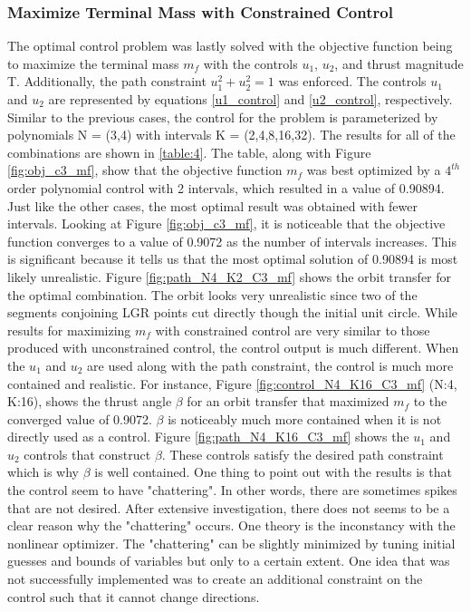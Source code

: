 \documentclass[]{article}
\begin{document}
	\subsubsection{Maximize Terminal Mass with Constrained Control}
	The optimal control problem was lastly solved with the objective function being to maximize the terminal mass \(m_f\) with the controls \(u_1\), \(u_2\), and thrust magnitude T. Additionally, the path constraint \(u_1^2 + u_2^2 = 1\) was enforced. The controls \(u_1\) and \(u_2\) are represented by equations \ref{u1_control} and \ref{u2_control}, respectively. Similar to the previous cases, the control for the problem is parameterized by polynomials N = (3,4) with intervals K = (2,4,8,16,32). The results for all of the combinations are shown in \ref{table:4}. The table, along with Figure \ref{fig:obj_c3_mf}, show that the objective function \(m_f\) was best optimized by a \(4^{th}\) order polynomial control with 2 intervals, which resulted in a value of 0.90894. Just like the other cases, the most optimal result was obtained with fewer intervals. Looking at Figure \ref{fig:obj_c3_mf}, it is noticeable that the objective function converges to a value of 0.9072 as the number of intervals increases. This is significant because it tells us that the most optimal solution of 0.90894 is most likely unrealistic. Figure \ref{fig:path_N4_K2_C3_mf} shows the orbit transfer for the optimal combination. The orbit looks very unrealistic since two of the segments conjoining LGR points cut directly though the initial unit circle. While results for maximizing \(m_f\) with constrained control are very similar to those produced with unconstrained control, the control output is much different. When the \(u_1\) and \(u_2\) are used along with the path constraint, the control is much more contained and realistic. For instance, Figure \ref{fig:control_N4_K16_C3_mf} (N:4, K:16), shows the thrust angle \(\beta\) for an orbit transfer that maximized \(m_f\) to the converged value of 0.9072. \(\beta\) is noticeably much more contained when it is not directly used as a control. Figure \ref{fig:path_N4_K16_C3_mf} shows the \(u_1\) and \(u_2\) controls that construct \(\beta\). These controls satisfy the desired path constraint which is why \(\beta\) is well contained. One thing to point out with the results is that the control seem to have "chattering". In other words, there are sometimes spikes that are not desired. After extensive investigation, there does not seems to be a clear reason why the "chattering" occurs. One theory is the inconstancy with the nonlinear optimizer. The "chattering" can be slightly minimized by tuning initial guesses and bounds of variables but only to a certain extent. One idea that was not successfully implemented was to create an additional constraint on the control such that it cannot change directions.
\end{document}
